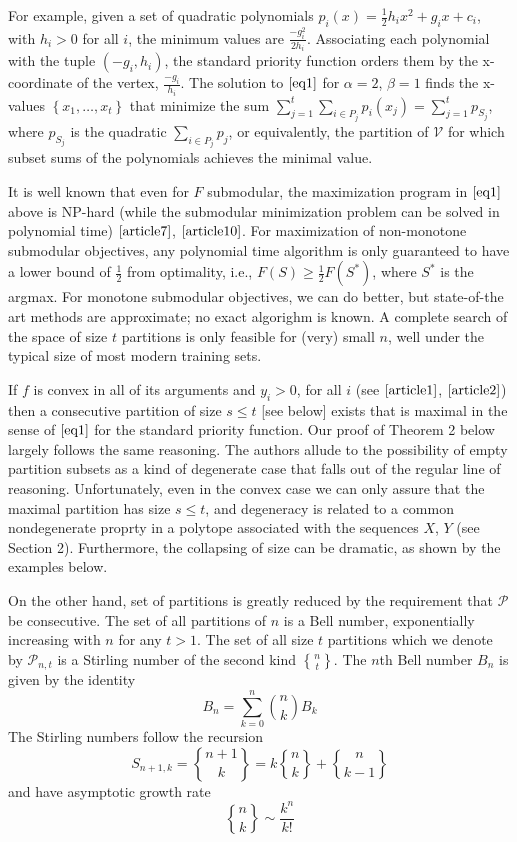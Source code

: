 \documentclass{article}
\theoremstyle{case}
\newcommand{\stirlingii}{\genfrac{\{}{\}}{0pt}{}}
\begin{document}
\vspace{4pt}

For example, given a set of quadratic polynomials $p_i(x) = \frac{1}{2}h_ix^2 + g_ix + c_i$, with $h_i >0$ for all $i$, the minimum values are $\frac{-g_i^2}{2h_i}$. Associating each polynomial with the tuple $(-g_i, h_i)$, the standard priority function orders them by the x-coordinate of the vertex, $\frac{-g_i}{h_i}$. The solution to $\ref{eq1}$ for $\alpha = 2$, $\beta = 1$ finds the x-values $\left\lbrace x_1, \dots, x_t\right\rbrace$ that minimize the sum $\sum_{j=1}^t \sum_{i \in P_j} p_i\left( x_j\right) = \sum_{j=1}^t p_{S_j}$, where $p_{S_j}$ is the quadratic $\sum_{i \in P_j} p_j$, or equivalently, the partition of $\mathcal{V}$ for which subset sums of the polynomials achieves the minimal value.

It is well known that even for $F$ submodular, the maximization program in $\ref{eq1}$ above is NP-hard (while the submodular minimization problem can be solved in polynomial time) $\cite{article7}$, $\cite{article10}$. For maximization of non-monotone submodular objectives, any polynomial time algorithm is only guaranteed to have a lower bound of $\frac{1}{2}$ from optimality, i.e., $F(S) \geq \frac{1}{2}F(S^{*})$, where $S^*$ is the argmax. For monotone submodular objectives, we can do better, but state-of-the art methods are approximate; no exact algorighm is known. A complete search of the space of size $t$ partitions is only feasible for (very) small $n$, well under the typical size of most modern training sets. 

If $f$ is convex in all of its arguments and $y_i > 0$, for all $i$ (see $\cite{article1}$, $\cite{article2}$) then a consecutive partition of size $s \leq t$ [see below] exists that is maximal in the sense of $\ref{eq1}$ for the standard priority function. Our proof of Theorem 2 below largely follows the same reasoning. The authors allude to the possibility of empty partition subsets as a kind of degenerate case that falls out of the regular line of reasoning. Unfortunately, even in the convex case we can only assure that the maximal partition has size $s \leq t$, and degeneracy is related to a common nondegenerate proprty in a polytope associated with the sequences $X$, $Y$ (see Section 2). 
Furthermore, the collapsing of size can be dramatic, as shown by the examples below.

On the other hand, set of partitions is greatly reduced by the requirement that $\mathcal{P}$ be consecutive. The set of all partitions of $n$ is a Bell number, exponentially increasing with $n$ for any $t > 1$. The set of all size $t$ partitions which we denote by $\mathcal{P}_{n,t}$ is a Stirling number of the second kind $\stirlingii{n}{t}$. The $n$th Bell number $B_n$ is given by the identity
\[B_n = \sum_{k=0}^{n} \binom{n}{k} B_k\]
The Stirling numbers follow the recursion
\[S_{n+1,k} = \stirlingii{n+1}{k} = k\stirlingii{n}{k} + \stirlingii{n}{k-1}\]
and have asymptotic growth rate 
\[\stirlingii{n}{k} \sim \frac{k^n}{k!}\]
\end{document}
